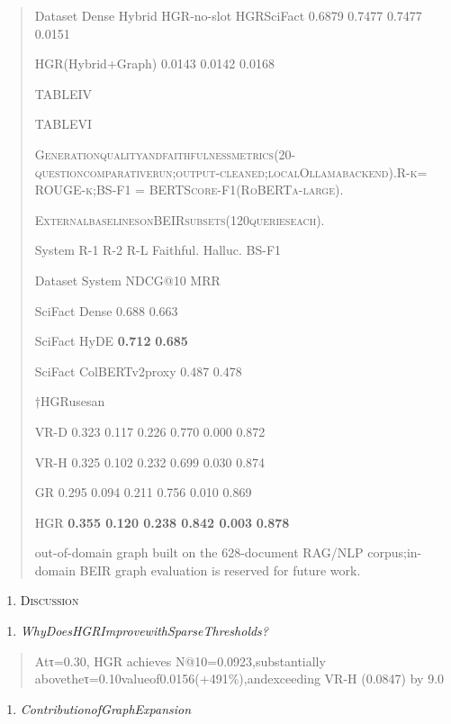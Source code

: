 \documentclass[
]{article}
\begin{document}
\begin{quote}
Dataset Dense Hybrid HGR-no-slot HGRSciFact 0.6879 0.7477 0.7477 0.0151

HGR(Hybrid+Graph) 0.0143 0.0142 0.0168

\protect{}\label{_bookmark13}{}TABLEIV

\protect{}\label{_bookmark14}{}TABLEVI

\textsc{Generationqualityandfaithfulnessmetrics(20-questioncomparativerun;output-cleaned;localOllamabackend).R-k= ROUGE-k;BS-F1 = BERTScore-F1(RoBERTa-large).}

\textsc{ExternalbaselinesonBEIRsubsets(120querieseach).}

System R-1 R-2 R-L Faithful. Halluc. BS-F1

Dataset System NDCG@10 MRR

SciFact Dense 0.688 0.663

SciFact HyDE \textbf{0.712} \textbf{0.685}

SciFact ColBERTv2proxy 0.487 0.478

†HGRusesan

VR-D 0.323 0.117 0.226 0.770 0.000 0.872

VR-H 0.325 0.102 0.232 0.699 0.030 0.874

GR 0.295 0.094 0.211 0.756 0.010 0.869

HGR \textbf{0.355 0.120 0.238 0.842 0.003} \textbf{0.878}

out-of-domain graph built on the 628-document RAG/NLP corpus;in-domain BEIR graph evaluation is reserved for future work.
\end{quote}

\begin{enumerate}
\def\labelenumi{\Roman{enumi}.}
\setcounter{enumi}{6}
\item
  \protect{}\label{Discussion}{}\textsc{Discussion}
\end{enumerate}

\begin{enumerate}
\def\labelenumi{\Alph{enumi}.}
\item
  \emph{WhyDoesHGRImprovewithSparseThresholds?}
\end{enumerate}

\begin{quote}
Atτ=0.30, HGR achieves N@10=0.0923,substantially abovetheτ=0.10valueof0.0156(+491\%),andexceeding VR-H (0.0847) by 9.0
\end{quote}

\begin{enumerate}
\def\labelenumi{\Alph{enumi}.}
\setcounter{enumi}{1}
\item
  \emph{ContributionofGraphExpansion}
\end{enumerate}
\end{document}
